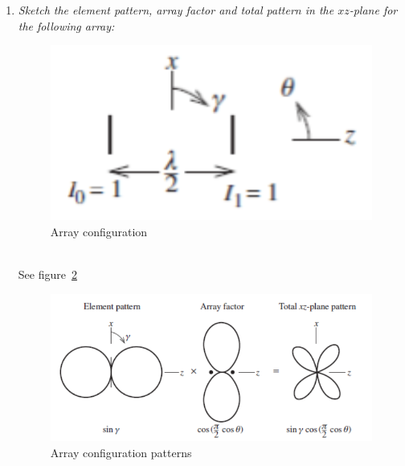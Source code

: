 \documentclass[11pt,a4paper]{article}
\begin{document}
\begin{enumerate}
    \item \emph{Sketch the element pattern, array factor and total pattern in the $xz$-plane for the following array:}
    \begin{figure}[!ht]
        \centering
        \includegraphics[width=.3\textwidth]{src/two-dipole-array.png}
        \caption{\label{fig:two-dipole-array}Array configuration}
    \end{figure}\\
    See figure~\ref{fig:two-dipole-array-pattern}
    \begin{figure}[!ht]
        \centering
        \includegraphics[width=.6\textwidth]{src/two-dipole-array-patterns.png}
        \caption{\label{fig:two-dipole-array-pattern}Array configuration patterns}
    \end{figure}
\end{enumerate}
\end{document}
